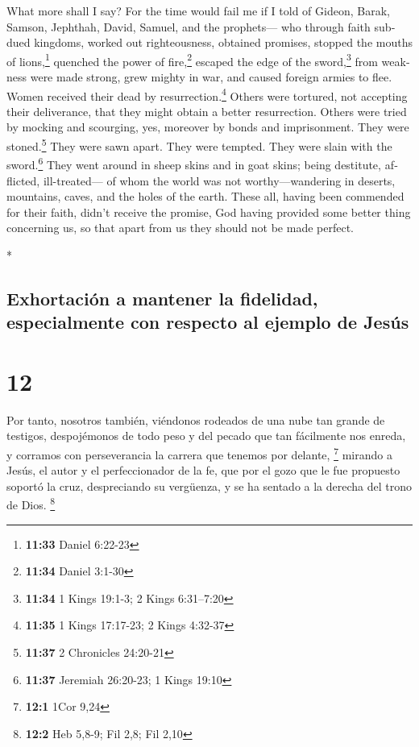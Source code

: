 \begin{paracol}{2}
\begin{otherlanguage}{english}
 What more shall I say? For the time would fail me if I
told of Gideon, Barak, Samson, Jephthah, David, Samuel, and the
prophets---  who through faith subdued kingdoms, worked
out righteousness, obtained promises, stopped the mouths of
lions,\footnote{\textbf{11:33} Daniel 6:22-23}  quenched
the power of fire,\footnote{\textbf{11:34} Daniel 3:1-30} escaped the
edge of the sword,\footnote{\textbf{11:34} 1 Kings 19:1-3; 2 Kings
  6:31--7:20} from weakness were made strong, grew mighty in war, and
caused foreign armies to flee.  Women received their dead
by resurrection.\footnote{\textbf{11:35} 1 Kings 17:17-23; 2 Kings
  4:32-37} Others were tortured, not accepting their deliverance, that
they might obtain a better resurrection.  Others were
tried by mocking and scourging, yes, moreover by bonds and imprisonment.
 They were stoned.\footnote{\textbf{11:37} 2 Chronicles
  24:20-21} They were sawn apart. They were tempted. They were slain
with the sword.\footnote{\textbf{11:37} Jeremiah 26:20-23; 1 Kings 19:10}
They went around in sheep skins and in goat skins; being destitute,
afflicted, ill-treated---  of whom the world was not
worthy---wandering in deserts, mountains, caves, and the holes of the
earth.  These all, having been commended for their faith,
didn't receive the promise,  God having provided some
better thing concerning us, so that apart from us they should not be
made perfect.

\end{otherlanguage}

\switchcolumn[0]*

\hypertarget{exhortaciuxf3n-a-mantener-la-fidelidad-especialmente-con-respecto-al-ejemplo-de-jesuxfas}{%
\subsection{Exhortación a mantener la fidelidad, especialmente con
respecto al ejemplo de
Jesús}\label{exhortaciuxf3n-a-mantener-la-fidelidad-especialmente-con-respecto-al-ejemplo-de-jesuxfas}}

\hypertarget{section-22}{%
\section{12}\label{section-22}}

 Por tanto, nosotros también, viéndonos rodeados de una
nube tan grande de testigos, despojémonos de todo peso y del pecado que
tan fácilmente nos enreda, y corramos con perseverancia la carrera que
tenemos por delante, \footnote{\textbf{12:1} 1Cor 9,24} 
mirando a Jesús, el autor y el perfeccionador de la fe, que por el gozo
que le fue propuesto soportó la cruz, despreciando su vergüenza, y se ha
sentado a la derecha del trono de Dios. \footnote{\textbf{12:2} Heb
  5,8-9; Fil 2,8; Fil 2,10}


\end{paracol}
